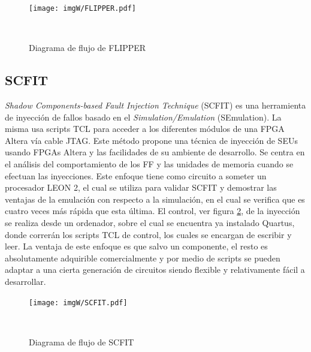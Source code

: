 \documentclass[a4paper,openright,12pt]{report}
\begin{document}
\begin{figure}[H]
	\centering
	\texttt{[image: imgW/FLIPPER.pdf]}
	\caption{Diagrama de flujo de FLIPPER}
     ~\cite{Alderighi2010}
	\label{Flipper}
\end{figure}

\subsection{SCFIT} 
\textit{Shadow Components-based Fault Injection Technique} (SCFIT)\cite{6176538} es una herramienta de inyección de fallos basado en el \textit{Simulation/Emulation} (SEmulation). La misma usa scripts TCL para acceder a los diferentes módulos de una FPGA Altera vía  cable JTAG.
Este método propone una técnica de inyección de SEUs usando FPGAs Altera y las facilidades de su ambiente de desarrollo. Se centra en el análisis del comportamiento de los FF y las unidades de memoria cuando se efectuan las inyecciones. Este enfoque tiene como circuito a someter un procesador LEON 2, el cual se utiliza para validar SCFIT y demostrar las ventajas de la emulación con respecto a la simulación, en el cual se verifica que es cuatro veces más rápida que esta última.
El control, ver figura \ref{SCFIT},  de la inyección se realiza desde un ordenador, sobre el cual se encuentra ya instalado Quartus, donde correrán los  scripts TCL de control, los cuales se encargan de escribir y leer.
La ventaja de este enfoque es que salvo un componente, el resto es absolutamente adquirible comercialmente y por medio de scripts se pueden adaptar a una cierta generación de circuitos siendo flexible y relativamente fácil a desarrollar.


\begin{figure}[H]
	\centering
	\texttt{[image: imgW/SCFIT.pdf]}
	\caption{Diagrama de flujo de SCFIT}
     ~\cite{Alderighi2010}
	\label{SCFIT}
\end{figure}
\end{document}
